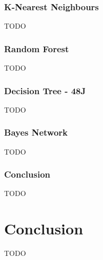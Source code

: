 \documentclass{sig-alternate-05-2015}
\begin{document}
\subsubsection{K-Nearest Neighbours}
TODO\\
\subsubsection{Random Forest}
TODO\\
\subsubsection{Decision Tree - 48J}
TODO\\
\subsubsection{Bayes Network}
TODO\\
\subsubsection{Conclusion}
TODO\\


\section{Conclusion}
TODO\\
\end{document}
